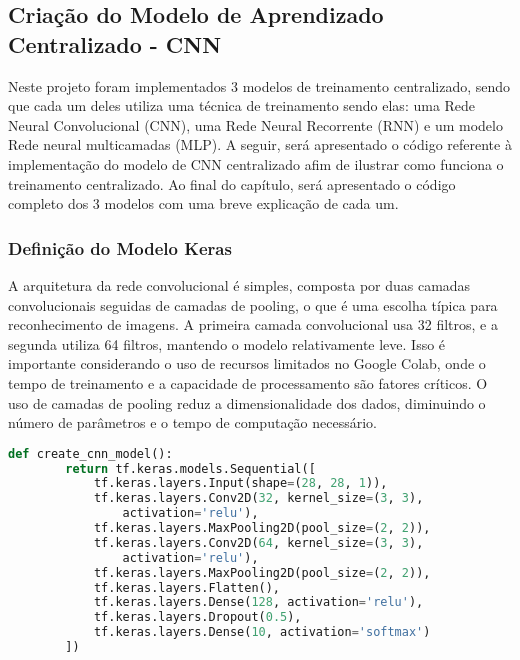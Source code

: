 \subsection{Criação do Modelo de Aprendizado Centralizado - CNN}

Neste projeto foram implementados 3 modelos de treinamento centralizado, sendo que cada um deles utiliza uma técnica de treinamento sendo elas: uma Rede Neural Convolucional (CNN), uma Rede Neural Recorrente (RNN) e um modelo Rede neural multicamadas (MLP). A seguir, será apresentado o código referente à implementação do modelo de CNN centralizado afim de ilustrar como funciona o treinamento centralizado. Ao final do capítulo, será apresentado o código completo dos 3 modelos com uma breve explicação de cada um.

\subsubsection{Definição do Modelo Keras}

A arquitetura da rede convolucional é simples, composta por duas camadas convolucionais seguidas de camadas de pooling, o que é uma escolha típica para reconhecimento de imagens. A primeira camada convolucional usa 32 filtros, e a segunda utiliza 64 filtros, mantendo o modelo relativamente leve. Isso é importante considerando o uso de recursos limitados no Google Colab, onde o tempo de treinamento e a capacidade de processamento são fatores críticos. O uso de camadas de pooling reduz a dimensionalidade dos dados, diminuindo o número de parâmetros e o tempo de computação necessário.

\begin{lstlisting}[language=Python, caption={Definição do modelo Keras centralizado}, label={lst:centralized_keras_model}]
    def create_cnn_model():
        return tf.keras.models.Sequential([
            tf.keras.layers.Input(shape=(28, 28, 1)),
            tf.keras.layers.Conv2D(32, kernel_size=(3, 3), 
                activation='relu'),
            tf.keras.layers.MaxPooling2D(pool_size=(2, 2)),
            tf.keras.layers.Conv2D(64, kernel_size=(3, 3), 
                activation='relu'),
            tf.keras.layers.MaxPooling2D(pool_size=(2, 2)),
            tf.keras.layers.Flatten(),
            tf.keras.layers.Dense(128, activation='relu'),
            tf.keras.layers.Dropout(0.5),
            tf.keras.layers.Dense(10, activation='softmax')
        ])
\end{lstlisting}

